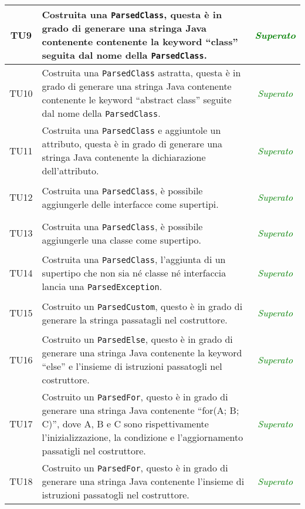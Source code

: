 \begin{longtable}{|c|>{}m{8cm}|c|}
\hypertarget{TU9}{TU9} & Costruita una \texttt{ParsedClass}, questa è in grado di generare una stringa Java contenente contenente la keyword ``class'' seguita dal nome della \texttt{ParsedClass}. & \textcolor{Green}{\textit{Superato}}\\ \hline
\hypertarget{TU10}{TU10} & Costruita una \texttt{ParsedClass} astratta, questa è in grado di generare una stringa Java contenente contenente le keyword ``abstract class'' seguite dal nome della \texttt{ParsedClass}. & \textcolor{Green}{\textit{Superato}}\\ \hline
\hypertarget{TU11}{TU11} & Costruita una \texttt{ParsedClass} e aggiuntole un attributo, questa è in grado di generare una stringa Java contenente la dichiarazione dell'attributo. & \textcolor{Green}{\textit{Superato}}\\ \hline
\hypertarget{TU12}{TU12} & Costruita una \texttt{ParsedClass}, è possibile aggiungerle delle interfacce come supertipi. & \textcolor{Green}{\textit{Superato}}\\ \hline
\hypertarget{TU13}{TU13} & Costruita una \texttt{ParsedClass}, è possibile aggiungerle una classe come supertipo. & \textcolor{Green}{\textit{Superato}}\\ \hline
\hypertarget{TU14}{TU14} & Costruita una \texttt{ParsedClass}, l'aggiunta di un supertipo che non sia né classe né interfaccia lancia una \texttt{ParsedException}. & \textcolor{Green}{\textit{Superato}}\\ \hline
\hypertarget{TU15}{TU15} & Costruito un \texttt{ParsedCustom}, questo è in grado di generare la stringa passatagli nel costruttore. & \textcolor{Green}{\textit{Superato}}\\ \hline
\hypertarget{TU16}{TU16} & Costruito un \texttt{ParsedElse}, questo è in grado di generare una stringa Java contenente la keyword ``else'' e l'insieme di istruzioni passatogli nel costruttore. & \textcolor{Green}{\textit{Superato}}\\ \hline
\hypertarget{TU17}{TU17} & Costruito un \texttt{ParsedFor}, questo è in grado di generare una stringa Java contenente ``for(A; B; C)'', dove A, B e C sono rispettivamente l'inizializzazione, la condizione e l'aggiornamento passatigli nel costruttore. & \textcolor{Green}{\textit{Superato}}\\ \hline
\hypertarget{TU18}{TU18} & Costruito un \texttt{ParsedFor}, questo è in grado di generare una stringa Java contenente l'insieme di istruzioni passatogli nel costruttore. & \textcolor{Green}{\textit{Superato}}\\ \hline

\end{longtable}
